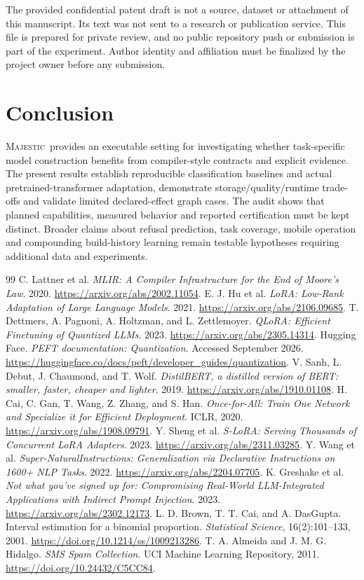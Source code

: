 \documentclass[11pt,a4paper]{article}
\newcommand{\sys}{\textsc{Majestic}}
\begin{document}
The provided confidential patent draft is not a source, dataset or attachment
of this manuscript. Its text was not sent to a research or publication service.
This file is prepared for private review, and no public repository push or
submission is part of the experiment. Author identity and affiliation must be
finalized by the project owner before any submission.

\section{Conclusion}
\sys\ provides an executable setting for investigating whether task-specific
model construction benefits from compiler-style contracts and explicit evidence.
The present results establish reproducible classification baselines and actual
pretrained-transformer adaptation, demonstrate
storage/quality/runtime trade-offs and validate limited declared-effect graph
cases. The audit shows that planned capabilities, measured behavior and reported
certification must be kept distinct. Broader claims about refusal prediction,
task coverage, mobile operation and compounding build-history learning remain
testable hypotheses requiring additional data and experiments.

\begin{thebibliography}{99}
 C. Lattner et al.
\emph{MLIR: A Compiler Infrastructure for the End of Moore's Law}. 2020.
\url{https://arxiv.org/abs/2002.11054}.
 E. J. Hu et al.
\emph{LoRA: Low-Rank Adaptation of Large Language Models}. 2021.
\url{https://arxiv.org/abs/2106.09685}.
 T. Dettmers, A. Pagnoni, A. Holtzman, and L. Zettlemoyer.
\emph{QLoRA: Efficient Finetuning of Quantized LLMs}. 2023.
\url{https://arxiv.org/abs/2305.14314}.
 Hugging Face.
\emph{PEFT documentation: Quantization}. Accessed September 2026.
\url{https://huggingface.co/docs/peft/developer_guides/quantization}.
 V. Sanh, L. Debut, J. Chaumond, and T. Wolf.
\emph{DistilBERT, a distilled version of BERT: smaller, faster, cheaper and lighter}. 2019.
\url{https://arxiv.org/abs/1910.01108}.
 H. Cai, C. Gan, T. Wang, Z. Zhang, and S. Han.
\emph{Once-for-All: Train One Network and Specialize it for Efficient Deployment}.
ICLR, 2020. \url{https://arxiv.org/abs/1908.09791}.
 Y. Sheng et al.
\emph{S-LoRA: Serving Thousands of Concurrent LoRA Adapters}. 2023.
\url{https://arxiv.org/abs/2311.03285}.
 Y. Wang et al.
\emph{Super-NaturalInstructions: Generalization via Declarative Instructions on
1600+ NLP Tasks}. 2022. \url{https://arxiv.org/abs/2204.07705}.
 K. Greshake et al.
\emph{Not what you've signed up for: Compromising Real-World LLM-Integrated
Applications with Indirect Prompt Injection}. 2023.
\url{https://arxiv.org/abs/2302.12173}.
 L. D. Brown, T. T. Cai, and A. DasGupta.
Interval estimation for a binomial proportion.
\emph{Statistical Science}, 16(2):101--133, 2001.
\url{https://doi.org/10.1214/ss/1009213286}.
 T. A. Almeida and J. M. G. Hidalgo.
\emph{SMS Spam Collection}. UCI Machine Learning Repository, 2011.
\url{https://doi.org/10.24432/C5CC84}.
\end{thebibliography}
\end{document}
